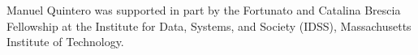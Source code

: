 \documentclass{article}
\theoremstyle{definition}
\begin{document}
Manuel Quintero was supported in part by the Fortunato and Catalina Brescia Fellowship at the Institute for Data, Systems, and Society (IDSS), Massachusetts Institute of Technology.





\appendix









\newpage
%
\end{document}
